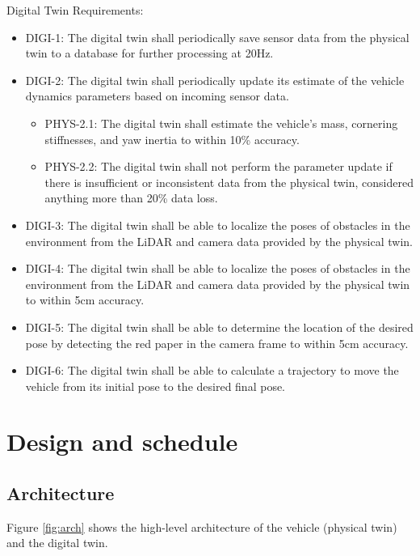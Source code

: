 Digital Twin Requirements:
\begin{itemize}
    \item DIGI-1: The digital twin shall periodically save sensor data from the physical twin to a database for further processing at 20Hz.
    \item DIGI-2: The digital twin shall periodically update its estimate of the vehicle dynamics parameters based on incoming sensor data.
    \begin{itemize}
        \item PHYS-2.1: The digital twin shall estimate the vehicle's mass, cornering stiffnesses, and yaw inertia to within 10\% accuracy.
        \item PHYS-2.2: The digital twin shall not perform the parameter update if there is insufficient or inconsistent data from the physical twin, considered anything more than 20\% data loss.
    \end{itemize}
    \item DIGI-3: The digital twin shall be able to localize the poses of obstacles in the environment from the LiDAR and camera data provided by the physical twin.
    \item DIGI-4: The digital twin shall be able to localize the poses of obstacles in the environment from the LiDAR and camera data provided by the physical twin to within 5cm accuracy.
    \item DIGI-5: The digital twin shall be able to determine the location of the desired pose by detecting the red paper in the camera frame to within 5cm accuracy.
    \item DIGI-6: The digital twin shall be able to calculate a trajectory to move the vehicle from its initial pose to the desired final pose.
\end{itemize}

\section{Design and schedule}

\subsection{Architecture}


Figure \ref{fig:arch} shows the high-level architecture of the vehicle (physical twin) and the digital twin.

